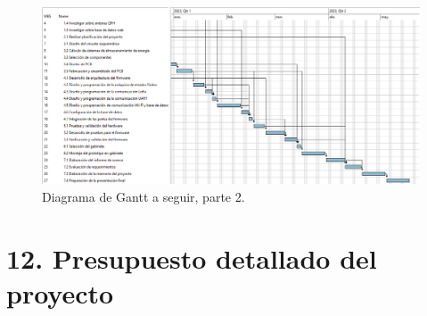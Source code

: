 \documentclass[
11pt, %
codirector, %
]{charter}
\begin{document}
\begin{landscape}
\begin{figure}[htpb]
\centering 
\includegraphics[height=.7\textheight]{./Figuras/Diagrama Gantt sin tareas en paralelo 2.png}
\caption{Diagrama de Gantt a seguir, parte 2.}
\label{fig:diagGantt4}
\end{figure}
\end{landscape}


\section{12. Presupuesto detallado del proyecto}
\label{sec:presupuesto}
\end{document}
